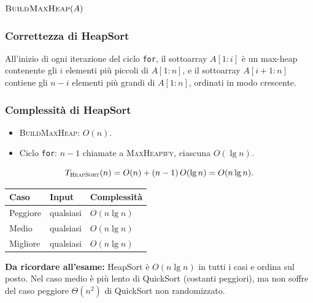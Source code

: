 \begin{algorithm}[H]
	\caption{\textsc{HeapSort}$(A)$}
	$\textsc{BuildMaxHeap}(A)$\;
\end{algorithm}

\subsubsection{Correttezza di HeapSort}

\begin{definizione}
	All'inizio di ogni iterazione del ciclo \texttt{for}, il sottoarray
	$A[1:i]$ è un max-heap contenente gli $i$ elementi più piccoli di
	$A[1:n]$, e il sottoarray $A[i+1:n]$ contiene gli $n-i$ elementi più
	grandi di $A[1:n]$, ordinati in modo crescente.
\end{definizione}

\subsubsection{Complessità di HeapSort}

\begin{itemize}
	\item \textsc{BuildMaxHeap}: $O(n)$.
	\item Ciclo \texttt{for}: $n-1$ chiamate a \textsc{MaxHeapify},
	ciascuna $O(\lg n)$.
\end{itemize}

\[
T_{\textsc{HeapSort}}(n) = O(n) + (n-1)\,O(\lg n) = O(n \lg n).
\]

\begin{center}
	\begin{tabular}{lll}
		\toprule
		\textbf{Caso} & \textbf{Input} & \textbf{Complessità} \\
		\midrule
		Peggiore & qualsiasi & $O(n \lg n)$ \\
		Medio    & qualsiasi & $O(n \lg n)$ \\
		Migliore & qualsiasi & $O(n \lg n)$ \\
		\bottomrule
	\end{tabular}
\end{center}

\begin{hardnote}
	\textbf{Da ricordare all'esame:} HeapSort è $O(n \lg n)$ in tutti i
	casi e ordina sul posto. Nel caso medio è più lento di QuickSort
	(costanti peggiori), ma non soffre del caso peggiore $\Theta(n^2)$ di
	QuickSort non randomizzato.
\end{hardnote}

